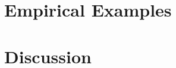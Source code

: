 \documentclass[fignum,letterpaper,12pt]{article}
\begin{document}


\section{Empirical Examples} \label{sec:examples}



\section{Discussion} \label{sec:conclusion}



\clearpage
\singlespacing
{}

\end{document}
